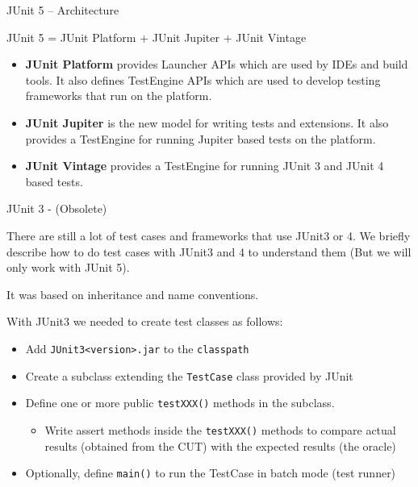 \documentclass[11pt, xcolor=svgnames]{beamer}
\providecommand{\alert}[1]{\textbf{#1}}
\begin{document}
\begin{frame}{JUnit 5 -- Architecture }

JUnit 5 = JUnit Platform + JUnit Jupiter + JUnit Vintage

\begin{itemize}
  \item \alert{JUnit Platform} provides Launcher APIs which are used by IDEs and build tools. It also defines TestEngine APIs which are used to develop testing frameworks that run on the platform.
  \item \alert{JUnit Jupiter} is the new model for writing tests and extensions. It also provides a TestEngine for running Jupiter based tests on the platform.
  \item \alert{JUnit Vintage} provides a TestEngine for running JUnit 3 and JUnit 4 based tests.
\end{itemize}

   
\end{frame}


\begin{frame}{JUnit 3 - (Obsolete)}

There are still a lot of test cases and frameworks that use JUnit3 or 4. We briefly describe how to do test cases with JUnit3 and 4 to understand them (But we will only work with JUnit 5).

It was based on inheritance and name conventions.

With JUnit3 we needed to create test classes as follows:

\begin{itemize}
 \item Add \texttt{JUnit3<version>.jar} to the \texttt{classpath}
 \item Create a subclass extending the \texttt{TestCase} class provided by JUnit
 \item Define one or more public \texttt{testXXX()} methods in the subclass.
 \begin{itemize}
  \item Write assert methods inside the \texttt{testXXX()} methods to compare actual results (obtained from the CUT) with the expected results (the oracle)
 \end{itemize}
 \item Optionally, define \texttt{main()} to run the TestCase in batch mode (test runner)
\end{itemize}


\end{frame}
\end{document}
